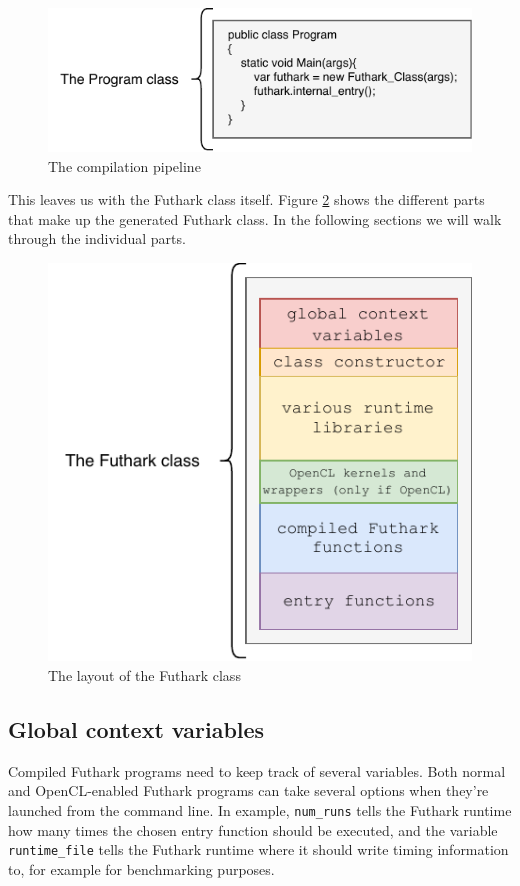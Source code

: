 \begin{figure}[h]
  \centering
  \includegraphics{chapters/figs/csharp/program_class.pdf}
  \caption{The \fshark{} compilation pipeline}
  \label{fig:programclass}
\end{figure}

This leaves us with the Futhark class itself.
Figure \ref{fig:futharkclass} shows the different parts that make up the
generated Futhark \csharp{} class. In the following sections we will walk
through the individual parts.

\begin{figure}[h]
  \centering
  \includegraphics{chapters/figs/csharp/futhark_class.pdf}
  \caption{The layout of the \csharp{} Futhark class}
  \label{fig:futharkclass}
\end{figure}

\subsection{Global context variables}
\label{globalcontextvariables}
Compiled Futhark programs need to keep track of several variables.
Both normal and OpenCL-enabled Futhark \csharp{} programs can take several
options when they're launched from the command line. In example,
\texttt{num\_runs} tells the Futhark runtime how many times the chosen entry
function should be executed, and the variable \texttt{runtime\_file} tells the
Futhark runtime where it should write timing information to, for example for
benchmarking purposes.

